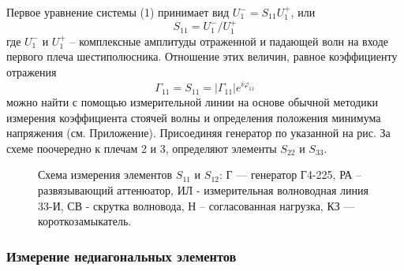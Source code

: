 \documentclass[a4paper,12pt]{article}
\begin{document}
Первое уравнение системы (1) принимает вид $U_1^-=S_{11}U_1^+$, или
\begin{equation}
	S _ { 11 } = U _ { 1 } ^ { - } / U _ { 1 } ^ { + }
\end{equation}
где $U _ { 1 } ^ { - }$ и $U _ { 1 } ^ { + }$ -- комплексные амплитуды отраженной и падающей волн на входе первого плеча шестиполюсника. Отношение этих величин, равное коэффициенту отражения 
\begin{equation}
	\Gamma _ { 11 } = S _ { 11 } = \left| \Gamma _ { 11 } \right| e ^ { i \varphi _ { 11 } }
\end{equation}
можно найти с помощью измерительной линии на основе обычной методики измерения коэффициента стоячей волны и определения положения минимума напряжения (см. Приложение). 
Присоединяя генератор по указанной на рис. За схеме поочередно к плечам 2 и 3, определяют элементы $S_{22}$ и $S_{33}$.

\begin{figure}[h!]
	\centering
	\caption{Схема измерения элементов $S_{11}$ и $S_{12}$:  Г --- генератор Г4-225, РА  -- развязывающий аттенюатор, ИЛ - измерительная волноводная линия 33-И, СВ - скрутка волновода,  Н -- согласованная нагрузка, КЗ --- короткозамыкатель.}
	\label{fig:fig3}
\end{figure}


\subsubsection{Измерение недиагональных элементов}
\end{document}
